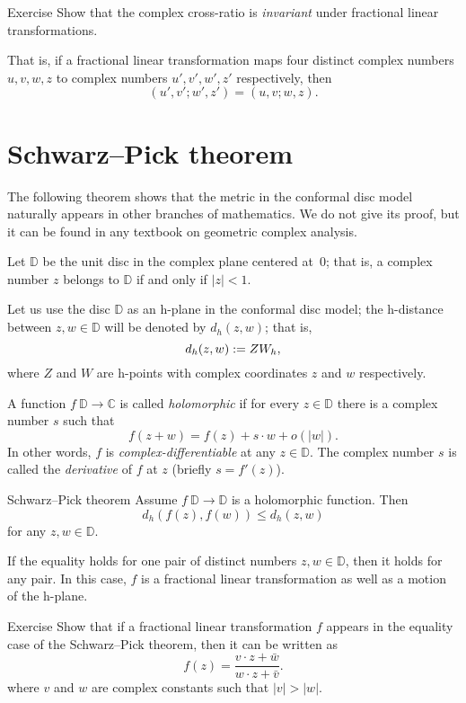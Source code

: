 \begin{thm}{Exercise}\label{ex:C-cross-ratio}
Show that the complex cross-ratio is {}\emph{invariant} under fractional linear transformations. 

That is, if a fractional linear transformation maps four distinct complex numbers $u, v, w, z$ to complex numbers $u', v', w', z'$ respectively, then
$$
(u',v';w',z')
=
(u,v;w,z).
$$

\end{thm}

\section{Schwarz--Pick theorem}

The following theorem shows 
that the metric in the conformal disc model naturally appears in other branches of mathematics.
We do not give its proof, but it can be found in any textbook on geometric complex analysis.

Let $\mathbb{D}$ be the unit disc in the complex plane centered at~$0$;
that is, a complex number $z$
belongs to $\mathbb{D}$ if and only if $|z|<1$.

Let us use the disc $\mathbb{D}$ as an h-plane in the conformal disc model;
the h-distance between $z, w\in\mathbb{D}$ will be denoted by $d_h(z,w)$;
that is,
\[d_h(z,w):= ZW_h,\]
where $Z$ and $W$ are h-points with complex coordinates $z$ and $w$ respectively.

A function $f\:\mathbb{D}\to \mathbb{C}$ is called \emph{holomorphic} if for every $z\in \mathbb{D}$
there is a complex number $s$ such that
\[f(z+w)=f(z)+s\cdot w+o(|w|).\]
In other words, $f$ is {}\emph{complex-differentiable}
at any $z\in\mathbb{D}$.
The complex number $s$ is called the {}\emph{derivative} of $f$ at $z$ (briefly $s=f'(z)$).

\begin{thm}{Schwarz--Pick theorem}
Assume $f\: \mathbb{D}\to \mathbb{D}$ is a holomorphic function.
Then 
\[d_h(f(z),f(w))\le d_h(z,w)\]
for any $z,w\in \mathbb{D}$.

If the equality holds for one pair of distinct numbers $z,w\in \mathbb{D}$, then it holds for any pair. 
In this case, $f$ is a fractional linear transformation as well as a motion of the h-plane.
\end{thm}

\begin{thm}{Exercise}\label{ex:schwarz-moebius}
Show that if a fractional linear transformation $f$ appears in the equality case of the Schwarz--Pick theorem, then it can be written as 
\[f(z)=\frac{v\cdot z+\bar w}{w\cdot z+\bar v}.\]
where $v$ and $w$ are complex constants such that $|v|>|w|$.
\end{thm}

